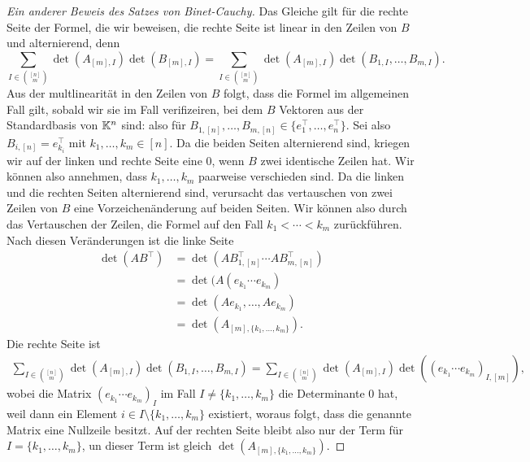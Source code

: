 \begin{proof}[Ein anderer Beweis des Satzes von Binet-Cauchy]
	 Das Gleiche gilt für die rechte Seite der Formel, die wir beweisen,  die rechte Seite ist linear in den Zeilen von $B$ und alternierend, denn 
	\[
	\sum_{I \in \binom{[n]}{m}} \det(A_{[m], I }) \det(B_{[m], I})  = \sum_{I \in \binom{[n]}{m}} \det(A_{[m], I }) \det(B_{1, I}, \ldots, B_{m,I}). 
	\]
	Aus der multlinearität in den Zeilen von $B$ folgt, dass die Formel im allgemeinen Fall gilt, sobald wir sie im Fall verifizeiren, bei dem $B$ Vektoren aus der Standardbasis von $\mathbb K^n$ sind: also für	 $B_{1,[n]},\ldots,B_{m,[n]} \in \{e_1^\top,\ldots, e_n^\top\}$. 	Sei also 
	$B_{i,[n]} = e_{k_i}^\top$ mit $k_1,\ldots,k_m \in [n]$. Da die beiden Seiten alternierend sind, kriegen wir auf der linken und rechte Seite eine $0$, wenn $B$ zwei identische Zeilen hat. Wir können also annehmen, dass $k_1,\ldots, k_m$ paarweise verschieden sind. Da die linken und die rechten Seiten alternierend sind, verursacht das vertauschen von zwei Zeilen von $B$ eine Vorzeichenänderung auf beiden Seiten. Wir können also durch das Vertauschen der Zeilen, die Formel auf den Fall $k_1 < \cdots < k_m$ zurückführen. Nach diesen Veränderungen ist die linke Seite 
	\begin{align*}
		\det (A B^\top) & = \det (A B_{1,[n]}^\top \cdots A B_{m,[n]}^\top) 
		\\ & = \det ( A ( e_{k_1} \cdots e_{k_m} ) 
		\\ &  = \det (A e_{k_1},\ldots, A e_{k_m}) 
		\\ & = \det(A_{[m], \{k_1,\ldots,k_m\}}). 
	\end{align*} 
	Die rechte Seite ist 
	\begin{align*} 
		\sum_{I \in \binom{[n]}{m}} \det(A_{[m], I }) \det(B_{1, I}, \ldots, B_{m,I}) = \sum_{I \in \binom{[n]}{m}} \det(A_{[m], I }) \det( (e_{k_1} \cdots e_{k_m})_{I,[m]} ), 
	\end{align*}
	wobei die Matrix $ (e_{k_1} \cdots e_{k_m})_I $ im Fall $I \ne \{k_1,\ldots,k_m\}$ die Determinante $0$ hat, weil dann ein Element $i \in I \setminus \{k_1,\ldots,k_m\}$ existiert, woraus folgt, dass die genannte Matrix eine Nullzeile besitzt. Auf der rechten Seite bleibt also nur der Term für $I= \{k_1,\ldots,k_m\}$, un dieser Term ist gleich $\det(A_{[m], \{k_1,\ldots,k_m\}}). $
\end{proof} 



